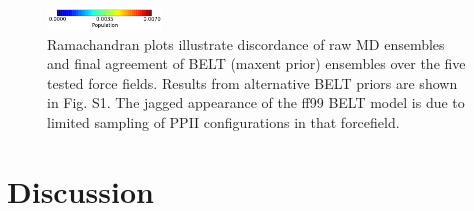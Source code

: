 \documentclass[journal=jacsat,manuscript=article]{achemso}
\begin{document}
\begin{figure}


\includegraphics[width=3.05cm]{figures/ALA3_rama_colorbar.pdf}


\caption{
Ramachandran plots illustrate discordance of raw MD ensembles and final agreement of BELT (maxent prior) ensembles over the five tested force fields. Results from alternative BELT priors are shown in Fig. S1.  The jagged appearance of the ff99 BELT model is due to limited sampling of PPII configurations in that forcefield.  
}
\label{figure:Rama}
\end{figure}

\section*{Discussion}
\end{document}
